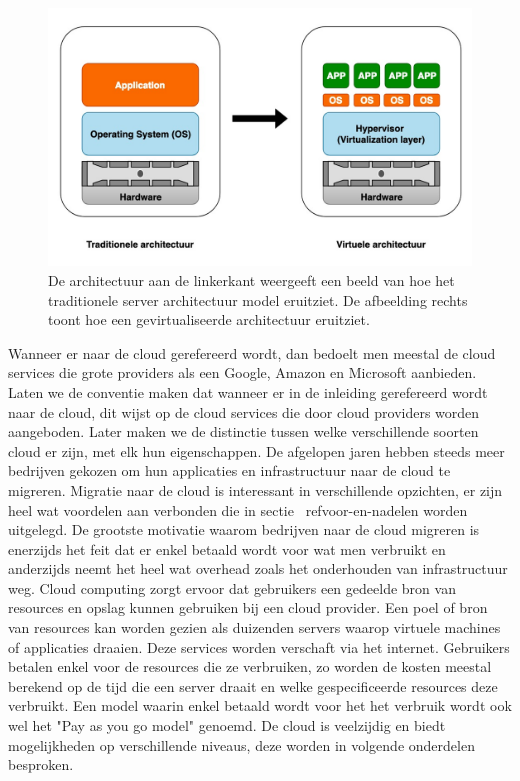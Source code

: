 \newline
\begin{figure}
    \includegraphics[width=1\textwidth]{img/klassiek_virtualisatie}
    \caption{De architectuur aan de linkerkant weergeeft een beeld van hoe het traditionele server architectuur model eruitziet. De afbeelding rechts toont hoe een gevirtualiseerde architectuur eruitziet.} 
    \label{fig:klassiek-vs-virtualisatie}  
\end{figure}
\newline

Wanneer er naar de cloud gerefereerd wordt, dan bedoelt men meestal de cloud services die grote providers als een Google, Amazon en Microsoft aanbieden. Laten we de conventie maken dat wanneer er in de inleiding gerefereerd wordt naar de cloud, dit wijst op de cloud services die door cloud providers worden aangeboden. Later maken we de distinctie tussen welke verschillende soorten cloud er zijn, met elk hun eigenschappen. De afgelopen jaren hebben steeds meer bedrijven gekozen om hun applicaties en infrastructuur naar de cloud te migreren. Migratie naar de cloud is interessant in verschillende opzichten, er zijn heel wat voordelen aan verbonden die in sectie ~ref{voor-en-nadelen} worden uitgelegd. De grootste motivatie waarom bedrijven naar de cloud migreren is enerzijds het feit dat er enkel betaald wordt voor wat men verbruikt en anderzijds neemt het heel wat overhead zoals het onderhouden van infrastructuur weg. Cloud computing zorgt ervoor dat gebruikers een gedeelde bron van resources en opslag kunnen gebruiken bij een cloud provider. Een poel of bron van resources kan worden gezien als duizenden servers waarop virtuele machines of applicaties draaien. Deze services worden verschaft via het internet. Gebruikers betalen enkel voor de resources die ze verbruiken, zo worden de kosten meestal berekend op de tijd die een server draait en welke gespecificeerde resources deze verbruikt. Een model waarin enkel betaald wordt voor het het verbruik wordt ook wel het "Pay as you go model" genoemd. De cloud is veelzijdig en biedt mogelijkheden op verschillende niveaus, deze worden in volgende onderdelen besproken. \autocite{Seghal2018} 


